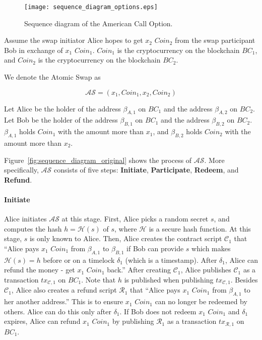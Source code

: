 \begin{figure}
    \texttt{[image: sequence\_diagram\_options.eps]}
    \caption{Sequence diagram of the American Call Option.}
    \label{fig:sequence_diagram_option}
\end{figure}

Assume the swap initiator Alice hopes to get $x_2$ $Coin_2$ from the swap participant Bob in exchange of $x_1$ $Coin_1$. 
$Coin_1$ is the cryptocurrency on the blockchain $BC_1$, and $Coin_2$ is the cryptocurrency on the blockchain $BC_2$.

We denote the Atomic Swap as 

$$\mathcal{AS} = (x_1, Coin_1, x_2, Coin_2)$$

Let Alice be the holder of the address $\beta_{A, 1}$ on $BC_1$ and the address $\beta_{A, 2}$ on $BC_2$.
Let Bob be the holder of the address $\beta_{B, 1}$ on $BC_1$ and the address $\beta_{B, 2}$ on $BC_2$.
$\beta_{A, 1}$ holds $Coin_1$ with the amount more than $x_1$, and $\beta_{B, 2}$ holds $Coin_2$ with the amount more than $x_2$.

Figure~\ref{fig:sequence_diagram_original} shows the process of $\mathcal{AS}$.
More specifically, $\mathcal{AS}$ consists of five steps:
\textbf{Initiate},
\textbf{Participate},
\textbf{Redeem}, and
\textbf{Refund}.


\paragraph{\textbf{Initiate}}
Alice initiates $\mathcal{AS}$ at this stage.
First, Alice picks a random secret $s$, and computes the hash $h = \mathcal{H}(s)$ of $s$, where $\mathcal{H}$ is a secure hash function.
At this stage, $s$ is only known to Alice.
Then, Alice creates the contract script $\mathcal{C}_1$ that ``Alice pays $x_1$ $Coin_1$ from $\beta_{A, 1}$ to $\beta_{B, 1}$ if Bob can provide $s$ which makes $\mathcal{H}(s) = h$ before or on a timelock $\delta_1$ (which is a timestamp). After $\delta_1$, Alice can refund the money - get $x_1$ $Coin_1$ back.''
After creating $\mathcal{C}_1$, Alice publishes $\mathcal{C}_1$ as a transaction $tx_{\mathcal{C}, 1}$ on $BC_1$.
Note that $h$ is published when publishing $tx_{\mathcal{C}, 1}$.
Besides $\mathcal{C}_1$, Alice also creates a refund script $\mathcal{R}_1$ that ``Alice pays $x_1$ $Coin_1$ from $\beta_{A, 1}$ to her another address.'' This is to ensure $x_1$ $Coin_1$ can no longer be redeemed by others. Alice can do this only after $\delta_1$.
If Bob does not redeem $x_1$ $Coin_1$ and $\delta_1$ expires, Alice can refund $x_1$ $Coin_1$ by publishing $\mathcal{R}_1$ as a transaction $tx_{\mathcal{R}, 1}$ on $BC_1$.

